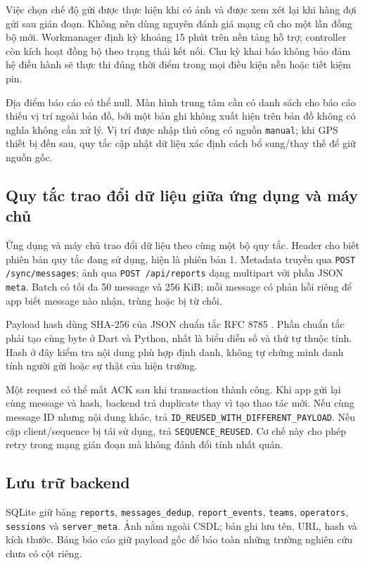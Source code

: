 Việc chọn chế độ gửi được thực hiện khi có ảnh và được xem xét lại khi hàng đợi gửi sau gián đoạn. Không nên dùng nguyên đánh giá mạng cũ cho một lần đồng bộ mới. Workmanager định kỳ khoảng 15 phút trên nền tảng hỗ trợ; controller còn kích hoạt đồng bộ theo trạng thái kết nối. Chu kỳ khai báo không bảo đảm hệ điều hành sẽ thực thi đúng thời điểm trong mọi điều kiện nền hoặc tiết kiệm pin.

Địa điểm báo cáo có thể null. Màn hình trung tâm cần có danh sách cho báo cáo thiếu vị trí ngoài bản đồ, bởi một bản ghi không xuất hiện trên bản đồ không có nghĩa không cần xử lý. Vị trí được nhập thủ công có nguồn \texttt{manual}; khi GPS thiết bị đến sau, quy tắc cập nhật dữ liệu xác định cách bổ sung/thay thế để giữ nguồn gốc.

\subsection{Quy tắc trao đổi dữ liệu giữa ứng dụng và máy chủ}
Ứng dụng và máy chủ trao đổi dữ liệu theo cùng một bộ quy tắc. Header  cho biết phiên bản quy tắc đang sử dụng, hiện là phiên bản 1. Metadata truyền qua \texttt{POST /sync/messages}; ảnh qua \texttt{POST /api/reports} dạng multipart với phần JSON \texttt{meta}. Batch có tối đa 50 message và 256 KiB; mỗi message có phản hồi riêng để app biết message nào nhận, trùng hoặc bị từ chối.

Payload hash dùng SHA-256 của JSON chuẩn tắc RFC 8785 \citep{rfc8785}. Phần chuẩn tắc phải tạo cùng byte ở Dart và Python, nhất là biểu diễn số và thứ tự thuộc tính. Hash ở đây kiểm tra nội dung phù hợp định danh, không tự chứng minh danh tính người gửi hoặc sự thật của hiện trường.

Một request có thể mất ACK sau khi transaction thành công. Khi app gửi lại cùng message và hash, backend trả duplicate thay vì tạo thao tác mới. Nếu cùng message ID nhưng nội dung khác, trả \texttt{ID\_REUSED\_WITH\_DIFFERENT\_PAYLOAD}. Nếu cặp client/sequence bị tái sử dụng, trả \texttt{SEQUENCE\_REUSED}. Cơ chế này cho phép retry trong mạng gián đoạn mà không đánh đổi tính nhất quán.

\subsection{Lưu trữ backend}
SQLite giữ bảng \texttt{reports}, \texttt{messages\_dedup}, \texttt{report\_events}, \texttt{teams}, \texttt{operators}, \texttt{sessions} và \texttt{server\_meta}. Ảnh nằm ngoài CSDL; bản ghi lưu tên, URL, hash và kích thước. Bảng báo cáo giữ payload gốc để bảo toàn những trường nghiên cứu chưa có cột riêng.

